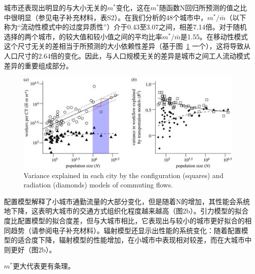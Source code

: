 城市还表现出明显的与大小无关的$m^*$变化，这在$m^*$随函数N回归所预测的值之比中很明显（参见电子补充材料，表S2）。在我们分析的48个城市中，$m^*/\bar{m}$（以下称为“流动性模式中的过度异质性”）介于0.43至3.07之间，相差7.14倍。对于随机选择的两个城市，的较大值和较小值之间的平均比率$m^*/\bar{m}$是1.55。在移动性模式这个尺寸无关的差相当于所预测的大小依赖性差异（基于图~\ref{rspb20130763f02} 一个），这将导致从人口尺寸的2.64倍的变化。因此，与人口规模无关的差异是城市之间工人流动模式差异的重要组成部分。
\begin{figure}
    \centering
    \includegraphics[width = 0.8\linewidth]{Pics/rspb20130763f02.jpg}
    \caption{Variance explained in each city by the configuration (squares) and radiation (diamonds) models of commuting flows.}
    \label{rspb20130763f02}
\end{figure}
配置模型解释了小城市通勤流量的大部分变化，但是随着N的增加，其性能会系统地下降，这表明大城市的交通方式组织化程度越来越高（图2b）。引力模型的拟合度比配置模型的拟合度差，但与大城市相比，它表现出与较小的城市更好拟合的相同趋势（请参阅电子补充材料）。辐射模型还显示出性能的系统变化：随着配置模型的适合度下降，辐射模型的性能增加，在小城市中表现相对较差，而在大城市中则更好（图2b）。

$m^*$更大代表更有条理。